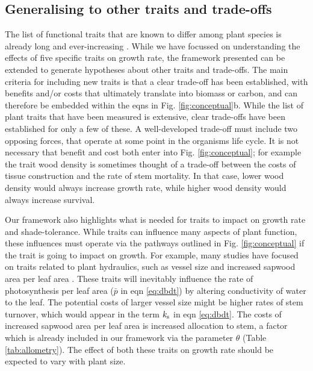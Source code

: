\documentclass[a4paper,11pt]{article}
\begin{document}
\subsection{Generalising to other traits and trade-offs}

The list of functional traits that are known to differ among plant species is already long and ever-increasing \citep{Perez-2013}. While we have focussed on understanding the effects of five specific traits on growth rate, the framework presented can be extended to generate hypotheses about other traits and trade-offs. The main criteria for including new traits is that a clear trade-off has been established, with benefits and/or costs that ultimately translate into biomass or carbon, and can therefore be embedded within the eqns in Fig. \ref{fig:conceptual}b. While the list of plant traits that have been measured is extensive, clear trade-offs have been established for only a few of these. A well-developed  trade-off must include two opposing forces, that operate at some point in the organisms life cycle. It is not necessary that benefit and cost both enter into Fig. \ref{fig:conceptual}; for example the trait wood density is sometimes thought of a trade-off between the costs of tissue construction and the rate of stem mortality. In that case, lower wood density would always increase growth rate, while higher wood density would always increase survival.

Our framework also highlights what is needed for traits to impact on growth rate and shade-tolerance. While traits can influence many aspects of plant function, these  influences must operate via the pathways outlined in Fig. \ref{fig:conceptual} if the trait is going to impact on growth. For example, many studies have focused on traits related to plant hydraulics, such as vessel size and increased sapwood area per leaf area \citep{Zanne-2010}. These traits will inevitably influence the rate of photosynthesis per leaf area ($\bar{p}$ in eqn \ref{eq:dbdt}) by altering conductivity of water to the leaf. The potential costs of larger vessel size might be higher rates of stem turnover, which would appear in the term $k_{\rm s}$ in eqn \ref{eq:dbdt}. The costs of increased sapwood area per leaf area is increased allocation to stem, a factor which is already included in our framework via the parameter $\theta$ (Table \ref{tab:allometry}). The effect of both these traits on growth rate should be expected to vary with plant size.

\end{document}

